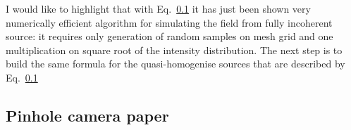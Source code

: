 
        I would like to highlight that with Eq.~\ref{} it has just been shown very numerically efficient algorithm for simulating the field from fully incoherent source: it requires only generation of random samples on mesh grid and one multiplication on square root of the intensity distribution. The next step is to build the same formula for the quasi-homogenise sources that are described by Eq.~\ref{}

    \subsection{Pinhole camera paper}
        

